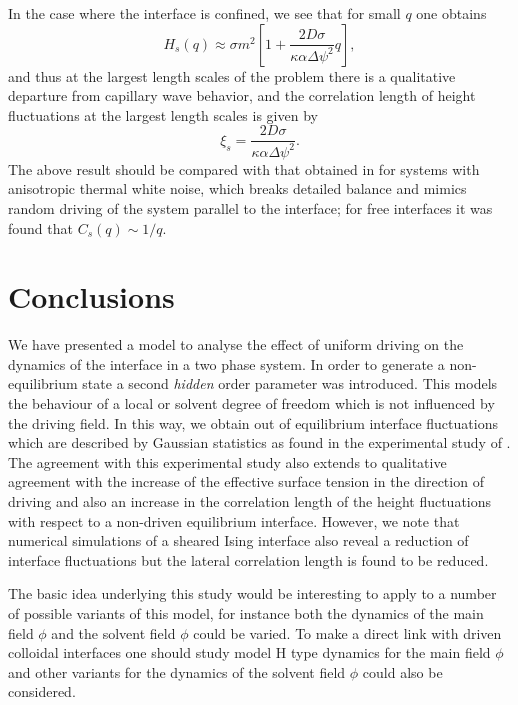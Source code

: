 In the case where the interface is confined, we see that for small $q$ one obtains
\begin{equation}
H_s(q) \approx \sigma m^2 \left[ 1+ \frac{2D\sigma }{\kappa\alpha \Delta\psi^2}q\right],
\end{equation}
and thus at the largest length scales of the problem there is a qualitative departure from capillary wave behavior, and the correlation length of height fluctuations at the largest length scales is given by
\begin{equation}
\xi_s = \frac{2D\sigma }{\kappa\alpha \Delta\psi^2}.
\end{equation}
The above result should be compared with that obtained in \cite{zia1991} for 
systems with anisotropic thermal white noise, which breaks detailed balance and mimics random driving of the system parallel to the interface; for free interfaces it was found that $C_s(q)\sim 1/q$.
\section{Conclusions}
We have presented a model to analyse the effect of uniform driving on the dynamics of the interface in a two phase system. In order to generate a non-equilibrium state a second {\em hidden} order parameter was introduced. This models the behaviour of a local or solvent degree of freedom which is not influenced by the driving field. In this way, we obtain out of equilibrium interface fluctuations which are described by Gaussian statistics as found in the experimental study of \cite{derks2006}. The agreement with this experimental study also extends to qualitative agreement with the increase of the effective surface tension in the direction of driving and also an increase in the correlation length of the height fluctuations with respect to a non-driven equilibrium interface. However, we  note that numerical simulations of a sheared Ising interface \cite{smith2008,smith2010} also reveal a reduction of interface fluctuations but the lateral correlation length is found to be reduced.

The basic idea underlying this study would be interesting to apply to a number of possible variants of this model, for instance both the dynamics
of the main field $\phi$ and the solvent field $\phi$ could be varied. To make a direct link with driven colloidal interfaces one should study model H type dynamics for the main field $\phi$ and other variants for the dynamics of the 
solvent field $\phi$ could also be considered. 


